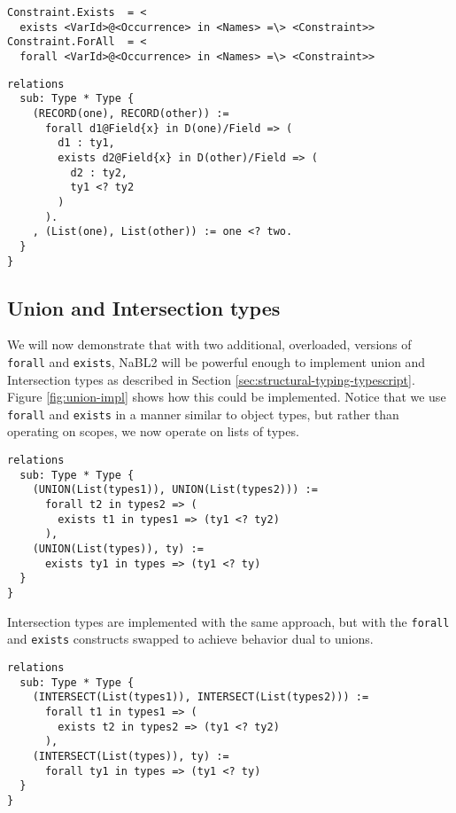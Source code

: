 \begin{figure*}
\begin{lstlisting}
Constraint.Exists  = <
  exists <VarId>@<Occurrence> in <Names> =\> <Constraint>>
Constraint.ForAll  = <
  forall <VarId>@<Occurrence> in <Names> =\> <Constraint>>
\end{lstlisting}
\caption{New constraint syntax constructs for NaBL2.}
\label{fig:nabl-syntax-proposal-constraint}
\end{figure*}

\begin{figure*}
\begin{lstlisting}
relations
  sub: Type * Type {
    (RECORD(one), RECORD(other)) :=
      forall d1@Field{x} in D(one)/Field => (
        d1 : ty1,
        exists d2@Field{x} in D(other)/Field => (
          d2 : ty2,
          ty1 <? ty2
        )
      ).
    , (List(one), List(other)) := one <? two.
  }
}
\end{lstlisting}
\caption{Example usage of the new syntax constructs for structural types.}
\label{fig:nabl-syntax-proposal-usage}
\end{figure*}

\subsection{Union and Intersection types}
We will now demonstrate that with two additional, overloaded, versions of \texttt{forall} and \texttt{exists},
NaBL2 will be powerful enough to implement union and Intersection types as described in Section \ref{sec:structural-typing-typescript}.
Figure \ref{fig:union-impl} shows how this could be implemented.
Notice that we use \texttt{forall} and \texttt{exists} in a manner similar to object types, 
but rather than operating on scopes, we now operate on lists of types.

\begin{figure*}
\begin{lstlisting}
relations
  sub: Type * Type {
    (UNION(List(types1)), UNION(List(types2))) :=
      forall t2 in types2 => (
        exists t1 in types1 => (ty1 <? ty2)
      ),
    (UNION(List(types)), ty) :=
      exists ty1 in types => (ty1 <? ty)
  }
}
\end{lstlisting}
\caption{Implementation of union types by using a custom subtype relation and overloaded \texttt{forall} and \texttt{exists} constraints.}
\label{fig:union-impl}
\end{figure*}

Intersection types are implemented with the same approach, but with the \texttt{forall} and \texttt{exists} constructs swapped to achieve behavior dual to unions.

\begin{figure*}
\begin{lstlisting}
relations
  sub: Type * Type {
    (INTERSECT(List(types1)), INTERSECT(List(types2))) :=
      forall t1 in types1 => (
        exists t2 in types2 => (ty1 <? ty2)
      ),
    (INTERSECT(List(types)), ty) :=
      forall ty1 in types => (ty1 <? ty)
  }
}
\end{lstlisting}
\caption{Intersection types, using the same constructs as union types.}
\label{fig:intersect-impl}
\end{figure*}